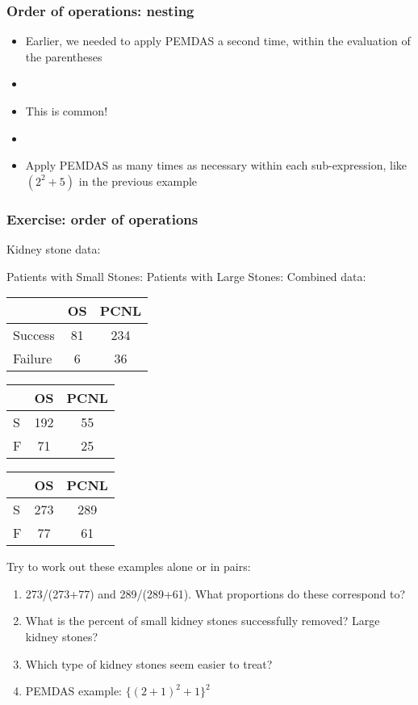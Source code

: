 \documentclass[11pt]{beamer}
\newcommand{\myframe}[1]{\begin{frame} \frametitle{#1}}
\begin{document}
\myframe{Order of operations: nesting}
\begin{itemize}
\item Earlier, we needed to apply PEMDAS a second time, within the evaluation of the parentheses
\item[]
\item This is common!
\item[]
\item Apply PEMDAS as many times as necessary within each sub-expression, like $(2^2 + 5)$ in the previous example
\end{itemize}
\end{frame}

\myframe{Exercise: order of operations}
Kidney stone data:

{\scriptsize
Patients with Small Stones: \hspace{0.5cm} Patients with Large Stones: \hspace{0.5cm} Combined data:

\hspace{-0.4cm}
\begin{tabular}{lcc}
 & OS & PCNL \\
 \hline
 Success & 81 & 234 \\
 Failure & 6 & 36 \\
 \hline
\end{tabular}
\hspace{0.8cm}
\begin{tabular}{lcc}
 & OS & PCNL \\
 \hline
 S & 192 & 55 \\
 F & 71 & 25 \\
 \hline
\end{tabular}
\hspace{0.7cm}
\begin{tabular}{lcc}
 & OS & PCNL \\
 \hline
 S & 273 & 289 \\
 F & 77 & 61 \\
 \hline
\end{tabular}
}

Try to work out these examples alone or in pairs:
\begin{enumerate}
\item 273/(273+77) and 289/(289+61). What proportions do these correspond to?
\item What is the percent of small kidney stones successfully removed? Large kidney stones?
\item Which type of kidney stones seem easier to treat?
\item PEMDAS example: $\{(2+1)^2 + 1\}^2$ 
\end{enumerate}
\end{frame}
\end{document}
